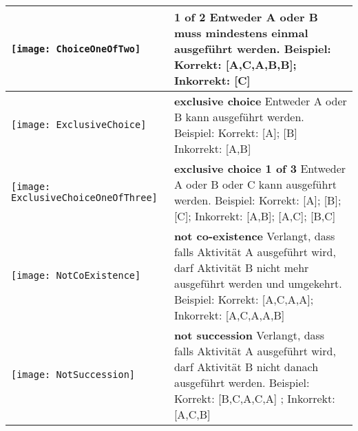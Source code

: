 \begin{longtable}{|p{}|p{}|}
\begin{center}
  \texttt{[image: ChoiceOneOfTwo]} %
    \end{center}&
\textbf{1 of 2} \newline Entweder A oder B muss mindestens einmal ausgeführt werden.\newline
Beispiel: Korrekt: [A,C,A,B,B]; Inkorrekt: [C]\\
\hline

\begin{center}

  \texttt{[image: ExclusiveChoice]} %
    \end{center} &
\textbf{exclusive choice}\newline
  Entweder A oder B kann ausgeführt werden. \newline
  Beispiel:  Korrekt: [A]; [B] Inkorrekt: [A,B] \\
\hline
\begin{center}

  \texttt{[image: ExclusiveChoiceOneOfThree]} %
    \end{center}&
\textbf{exclusive choice 1 of 3} \newline
 Entweder A oder B oder C kann ausgeführt werden. \newline
  Beispiel:  Korrekt: [A]; [B]; [C]; Inkorrekt: [A,B]; [A,C]; [B,C] \\
\hline
\begin{center}

  \texttt{[image: NotCoExistence]} %
    \end{center} &
\textbf{not co-existence}\newline
  Verlangt, dass falls Aktivität A ausgeführt wird, darf Aktivität B nicht mehr ausgeführt werden und umgekehrt.
  \newline
  Beispiel: Korrekt: [A,C,A,A]; Inkorrekt: [A,C,A,A,B] \\
\hline

\hline
\begin{center}

  \texttt{[image: NotSuccession]} %
    \end{center} &
\textbf{not succession}\newline
  Verlangt, dass falls Aktivität A ausgeführt wird, darf Aktivität B nicht danach ausgeführt werden.
  \newline
  Beispiel: Korrekt: [B,C,A,C,A] ; Inkorrekt: [A,C,B]\\
\hline


\end{longtable}
